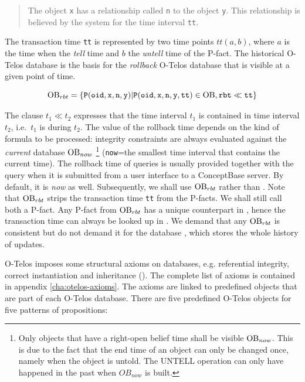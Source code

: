 \begin{quote}
  The object {\tt x} has a relationship called {\tt n} to the object
  {\tt y}. This relationship is believed by the system for the time interval
  {\tt tt}.
\end{quote}


The transaction time {\tt tt} is represented by two time points $tt(a,b)$, where $a$ is
the time when the {\em tell\/} time and $b$ the {\em untell\/} time of the
P-fact. 
The historical O-Telos database is the basis for the {\em rollback\/} O-Telos database that
is visible at a given point of time. 


$$  \hbox{\rm OB}_{rbt} = \{{\tt P(oid,x,n,y)}| {\tt P(oid,x,n,y,tt)} \in \hbox{\rm OB}, {\tt rbt} \ll {\tt tt}\} $$

The clause  $t_1 \ll t_2$ expresses that the time interval $t_1$ is contained
in time interval $t_2$, i.e.\ $t_1$ is during $t_2$.
The value of the rollback time depends on the kind of formula to be
processed: integrity constraints are always evaluated against the {\em current\/} database
$\hbox{\rm OB}_{now}$%
\footnote{Only objects that have a right-open belief
time shall be visible $\hbox{\rm OB}_{now}$. This is due to the fact that the end time of an
object can only be changed once, namely when the object is untold. The UNTELL
operation can only have happened in the past when $OB_{now}$ is built.}
({\tt now}=the smallest time interval that contains the current time).
The rollback time of queries is usually provided together with the query
when it is submitted from a user interface to a ConceptBase server.
By default, it is {\it now} as well.
Subsequently, we shall use $\hbox{\rm OB}_{rbt}$ rather than {\OB}. Note that
$\hbox{\rm OB}_{rbt}$ strips the transaction time {\tt tt} from the P-facts. We shall still
call both a P-fact. Any P-fact from  $\hbox{\rm OB}_{rbt}$ has a unique counterpart
in {\OB}, hence the transaction time can always be looked up in {\OB}.
We demand that any $\hbox{\rm OB}_{rbt}$ is consistent but do not demand it
for the database {\OB}, which stores the whole history of updates.


O-Telos imposes some structural axioms on databases, e.g. referential
integrity, correct instantiation and inheritance (\cite{jeus92}). The
complete list of axioms is contained in appendix \ref{cha:otelos-axioms}.
The axioms are linked to predefined objects that are part of each O-Telos database.
There are five predefined O-Telos objects for five patterns of propositions:

